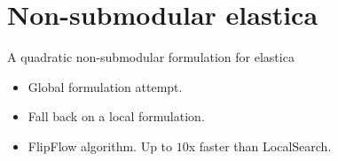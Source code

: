 \section{Non-submodular elastica}

\begin{frame}
\center
\huge
A quadratic non-submodular formulation for elastica

\vspace{2em}

\begin{minipage}{0.7\textwidth}
\normalsize
\begin{itemize}
\item{Global formulation attempt.}
\item{Fall back on a local formulation.}
\item{FlipFlow algorithm. Up to $10$x faster than LocalSearch.}
\end{itemize}
\end{minipage}

\end{frame}

